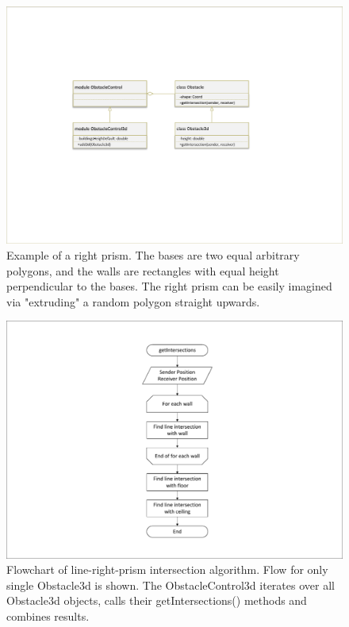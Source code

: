 \documentclass[]{nsm-thesis}
\begin{document}
\begin{figure}
	\centering
	\includegraphics[width=1\textwidth]{figures/Obstacle3d-classes.pdf}
	\caption{Example of a right prism. The bases are two equal arbitrary polygons, and the walls are rectangles with equal height perpendicular to the bases. The right prism can be easily imagined via "extruding" a random polygon straight upwards.}
	\label{fig:obstacle3d-classes}
\end{figure}

\begin{figure}
	\centering
	\includegraphics[width=1\textwidth]{figures/Obstacle3d-flow.pdf}
	\caption{Flowchart of line-right-prism intersection algorithm. Flow for only single Obstacle3d is shown. The ObstacleControl3d iterates over all Obstacle3d objects, calls their getIntersections() methods and combines results.}
	\label{fig:obstacle3d-flow}
\end{figure}
\end{document}

